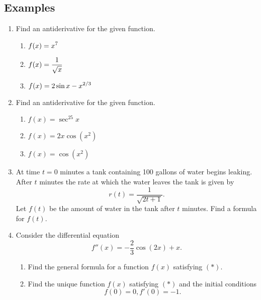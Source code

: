 \documentclass[11pt]{article}
\theoremstyle{definition}
\theoremstyle{named}
\numberwithin{myalgctr}{section}
\begin{document}
\subsection*{Examples}
\begin{enumerate}
  \item Find an antiderivative for the given function.
  \begin{enumerate}
    \item $\displaystyle f(x)=x^7$
    \item $\displaystyle f(x)=\frac{1}{\sqrt{x}}$
    \item $\displaystyle f(x)=2\sin x-x^{2/3}$
  \end{enumerate}
  \item Find an antiderivative for the given function.
  \begin{enumerate}
    \item $f(x)=\sec^25x$
    \item $f(x)=2x\cos(x^2)$
    \item $f(x)=\cos(x^2)$
  \end{enumerate}
  \item At time $t=0$ minutes a tank containing 100 gallons of water begins leaking. After $t$ minutes the rate at which the water leaves the tank is given by
  \[
  r(t)=\frac{1}{\sqrt{2t+1}}.
  \]
  Let $f(t)$ be the amount of water in the tank after $t$ minutes. Find a formula for $f(t)$.

    \item Consider the differential equation
    \[
    f''(x)=-\frac{2}{3}\cos(2x)+x \tag{$*$}.
    \]
    \begin{enumerate}
      \item Find the general formula for a function $f(x)$ satisfying $(*)$.
      \item Find the unique function $f(x)$ satisfying $(*)$ and the initial conditions
      \[
      f(0)=0, f'(0)=-1.
      \]

  \end{enumerate}
\end{enumerate}
\end{document}
